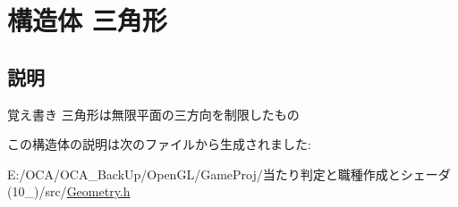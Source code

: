 \hypertarget{struct_xE4_xB8_x89_xE8_xA7_x92_xE5_xBD_xA2}{\section{構造体 三角形}
\label{struct_xE4_xB8_x89_xE8_xA7_x92_xE5_xBD_xA2}
}


\subsection{説明}
\begin{DoxyNote}{覚え書き}
三角形は無限平面の三方向を制限したもの 
\end{DoxyNote}


この構造体の説明は次のファイルから生成されました\-:\begin{DoxyCompactItemize}
\item 
E\-:/\-O\-C\-A/\-O\-C\-A\-\_\-\-Back\-Up/\-Open\-G\-L/\-Game\-Proj/当たり判定と職種作成とシェーダ(10\-\_)/src/\hyperlink{_geometry_8h}{Geometry.\-h}\end{DoxyCompactItemize}
